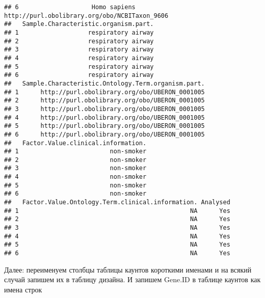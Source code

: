 \documentclass[
]{article}
\begin{document}
\begin{verbatim}
## 6                    Homo sapiens http://purl.obolibrary.org/obo/NCBITaxon_9606
##   Sample.Characteristic.organism.part.
## 1                   respiratory airway
## 2                   respiratory airway
## 3                   respiratory airway
## 4                   respiratory airway
## 5                   respiratory airway
## 6                   respiratory airway
##   Sample.Characteristic.Ontology.Term.organism.part.
## 1      http://purl.obolibrary.org/obo/UBERON_0001005
## 2      http://purl.obolibrary.org/obo/UBERON_0001005
## 3      http://purl.obolibrary.org/obo/UBERON_0001005
## 4      http://purl.obolibrary.org/obo/UBERON_0001005
## 5      http://purl.obolibrary.org/obo/UBERON_0001005
## 6      http://purl.obolibrary.org/obo/UBERON_0001005
##   Factor.Value.clinical.information.
## 1                         non-smoker
## 2                         non-smoker
## 3                         non-smoker
## 4                         non-smoker
## 5                         non-smoker
## 6                         non-smoker
##   Factor.Value.Ontology.Term.clinical.information. Analysed
## 1                                               NA      Yes
## 2                                               NA      Yes
## 3                                               NA      Yes
## 4                                               NA      Yes
## 5                                               NA      Yes
## 6                                               NA      Yes
\end{verbatim}

Далее: переименуем столбцы таблицы каунтов короткими именами и на всякий
случай запишем их в таблицу дизайна. И запишем Gene.ID в таблице каунтов
как имена строк
\end{document}
